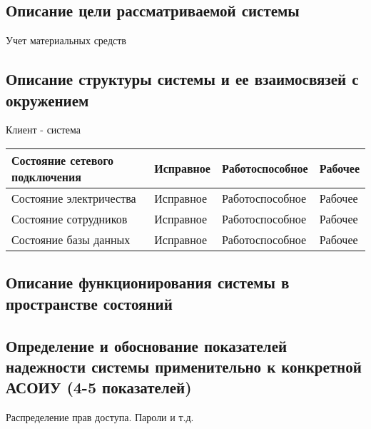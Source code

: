 \documentclass[14pt]{extarticle}
\begin{document}
\subsection{Описание цели рассматриваемой системы}

Учет материальных средств

\subsection{Описание структуры системы и ее взаимосвязей с окружением}

Клиент - система

\begin{tabular}{|p{}|p{}|p{}|p{}|}
	\hline
Состояние сетевого подключения & Исправное & Работоспособное & Рабочее \\ \hline
Состояние электричества & Исправное & Работоспособное & Рабочее \\ \hline
Состояние сотрудников & Исправное & Работоспособное & Рабочее \\ \hline
Состояние базы данных  & Исправное & Работоспособное & Рабочее \\ \hline
\end{tabular}


\subsection{Описание функционирования системы в пространстве состояний}


\subsection{Определение и обоснование показателей надежности системы применительно к конкретной АСОИУ (4-5 показателей)}

Распределение прав доступа. Пароли и т.д.
\end{document}
